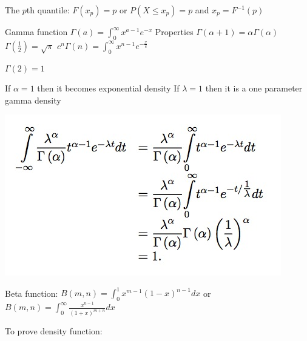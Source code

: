 \documentclass{examnotes}
\begin{document}
{The $p$th quantile: $F(x_p)=p$ \quad or $P(X\le x_p)=p$ \quad and $x_p=F^{-1}(p)$



Gamma function $\Gamma(a)=\displaystyle\int_0^\infty{x^{a-1}e^{-x}}$ \quad Properties $\Gamma(\alpha+1)=\alpha\Gamma(\alpha)$ \quad $\Gamma(\frac{1}{2})=\sqrt{\pi}$
\quad $c^n\Gamma(n)=\displaystyle\int_0^\infty{x^{n-1}e^{-\displaystyle\frac{x}{c}}}$

$\Gamma(2) = 1$ \vspace{6pt}

If $\alpha=1$ then it becomes exponential density
If $\lambda=1$ then it is a one parameter gamma density

\includegraphics[scale=0.4]{./img/2gam.jpg}



Beta function: $B(m,n)=\displaystyle\int_0^1{x^{m-1}(1-x)^{n-1}dx}$ \quad or $B(m,n)=\displaystyle\int_0^\infty{\frac{x^{n-1}}{(1+x)^{m+n}}dx}$

To prove density function:

}
\end{document}
